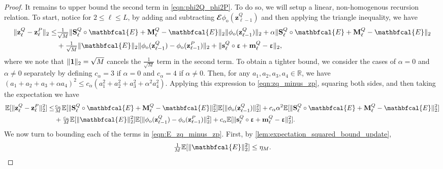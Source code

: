 \documentclass[twoside]{article}
\renewcommand{\ss}[1]{_{\text{#1}}}
\newcommand{\vm}{\mathbf{m}}
\newcommand{\vs}{\mathbf{s}}
\newcommand{\vz}{\mathbf{z}}
\newcommand{\vep}{\bm{\upvarepsilon}}
\newcommand{\vone}{\mathbf{1}}
\newcommand{\mM}{\mathbf{M}}
\newcommand{\mS}{\mathbf{S}}
\newcommand{\E}{\mathbb{E}}
\newcommand{\had}{\circ}
\renewcommand{\ss}[1]{_{\text{#1}}}        %
\DeclarePairedDelimiter\norm{\|}{\|}             %
\theoremstyle{theoremstyle}
\begin{document}
\begin{proof}
It remains to upper bound the second term in \cref{eqn:phi2Q_phi2P}. To do so, we will setup a linear, non-homogenous recursion relation. To start, notice for $2 \leq \ell \le L$, by adding and subtracting $\mathbfcal{E}\phi\ss{o}(\vz^Q_{\ell-1})$ and then applying the triangle inequality, we have
\begin{equation}
    \begin{split}
    \norm{\vz^Q_\ell - \vz^P_\ell}_2 
    \le & \tfrac1{\sqrt{M}}\norm{\mS^Q_\ell \had \mathbfcal{E} + \mM^Q_\ell - \mathbfcal{E}}_2 \norm{\phi\ss{o}(\vz^Q_{\ell-1})}_2 
    + \alpha\norm{\mS^Q_\ell \had \mathbfcal{E} + \mM^Q_\ell - \mathbfcal{E}}_2 \\
    & + \tfrac1{\sqrt{M}}\norm{ \mathbfcal{E}}_2 \norm{\phi\ss{o}( \vz^Q_{\ell-1}) - \phi\ss{o}(\vz^P_{\ell-1})}_2 
    + \norm{\vs^Q_\ell \had \vep + \vm^Q_\ell - \vep}_2, \label{eqn:zq_minus_zp} 
    \end{split}
\end{equation}
where we note that $\norm{\vone}_2=\sqrt{M}$ cancels the $\tfrac{1}{\sqrt{M}}$ term in the second term. 
To obtain a tighter bound, we consider the cases of $\alpha=0$ and $\alpha\neq0$ separately by defining $c_\alpha = 3$ if $\alpha=0$ and $c_\alpha = 4$ if $\alpha\neq0$. Then, for any $a_1, a_2, a_3, a_4 \in \mathbb{R}$, we have $(a_1 + a_2 + a_3 + \alpha a_4)^2 \le c_\alpha(a_1^2 + a_2^2 + a_3^2 + \alpha^2 a_4^2)$. Applying this expression to \cref{eqn:zq_minus_zp}, squaring both sides, and then taking the expectation we have
\begin{equation}
    \begin{split}
    \E[\norm{\vz^Q_\ell - \vz^P_\ell}_2^2]
    \le & \tfrac{c_\alpha}{M}\E[\norm{\mS^Q_\ell \had \mathbfcal{E} + \mM^Q_\ell - \mathbfcal{E}}_2^2] \E[\norm{\phi\ss{o}(\vz^Q_{\ell-1})}_2^2]
    + c_\alpha \alpha^2\E[\norm{\mS^Q_\ell \had \mathbfcal{E} + \mM^Q_\ell - \mathbfcal{E}}_2^2] \\
    & + \tfrac{c_\alpha}{M}\E[\norm{ \mathbfcal{E}}_2^2] \E[\norm{\phi\ss{o}( \vz^Q_{\ell-1}) - \phi\ss{o}(\vz^P_{\ell-1})}_2^2] 
    + c_\alpha \E[\norm{\vs^Q_\ell \had \vep + \vm^Q_\ell - \vep}_2^2].\label{eqn:E_zq_minus_zp} 
    \end{split}
\end{equation}
We now turn to bounding each of the terms in \cref{eqn:E_zq_minus_zp}. First, by \cref{lem:expectation_squared_bound_update},
\begin{equation}
\tfrac{1}{M}\E[\norm{\mathbfcal{E}}_2^2] \le \eta_M.
\end{equation}

\end{proof}
\end{document}
